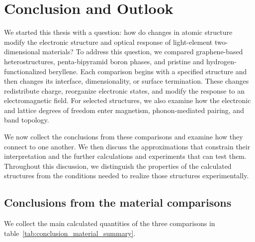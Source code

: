 \chapter{Conclusion and Outlook}
\label{cha:conclusion_outlook}

We started this thesis with a question: how do changes in atomic structure modify the electronic structure and optical response of light-element two-dimensional materials?
To address this question, we compared graphene-based heterostructures, penta-bipyramid boron phases, and pristine and hydrogen-functionalized beryllene.
Each comparison begins with a specified structure and then changes its interface, dimensionality, or surface termination.
These changes redistribute charge, reorganize electronic states, and modify the response to an electromagnetic field.
For selected structures, we also examine how the electronic and lattice degrees of freedom enter magnetism, phonon-mediated pairing, and band topology.

We now collect the conclusions from these comparisons and examine how they connect to one another.
We then discuss the approximations that constrain their interpretation and the further calculations and experiments that can test them.
Throughout this discussion, we distinguish the properties of the calculated structures from the conditions needed to realize those structures experimentally.

\FloatBarrier
\section{Conclusions from the material comparisons}
\label{sec:conclusions_material_comparisons}

We collect the main calculated quantities of the three comparisons in table~\ref{tab:conclusion_material_summary}.

